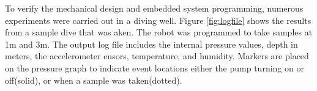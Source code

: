%
%
%
%
To verify the mechanical design and
embedded system programming, numerous experiments were carried out in a diving
well. Figure \ref{fig:logfile} shows the results from a sample dive that was
aken. The robot was programmed to take samples at 1m and 3m. The output log
file includes the internal pressure values, depth in meters, the accelerometer
ensors, temperature, and humidity. Markers are placed on the pressure graph to
indicate event locations either the pump turning on or off(solid), or when a
sample was taken(dotted).

